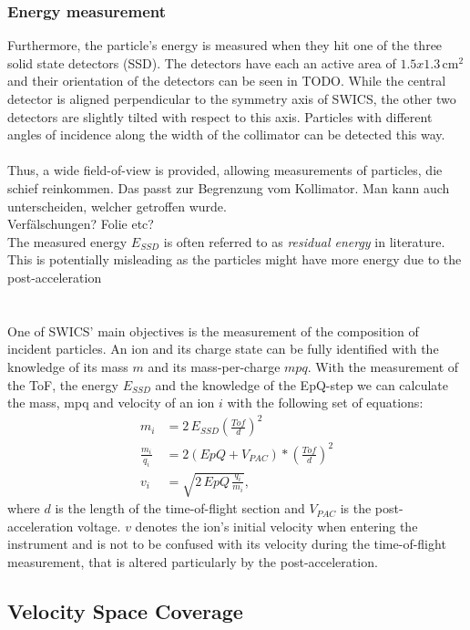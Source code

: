 \subsubsection{Energy measurement}
Furthermore, the particle's energy is measured when they hit one of the three solid state detectors (SSD). The detectors have each an active area of $1.5 x 1.3 \,\mathrm{cm^2}$ and their orientation of the detectors can be seen in TODO. While the central detector is aligned perpendicular to the symmetry axis of SWICS, the other two detectors are slightly tilted with respect to this axis. Particles with different angles of incidence along the width of the collimator can be detected this way.
\\ \\
Thus, a wide field-of-view is provided, allowing measurements of particles, die schief reinkommen. Das passt zur Begrenzung vom Kollimator. Man kann auch unterscheiden, welcher getroffen wurde.\\
Verfälschungen? Folie etc? \\ 
The measured energy $E_{SSD}$ is often referred to as \textit{residual energy} in literature. This is potentially misleading as the particles might have more energy due to the post-acceleration 
\\ \\ \\
One of SWICS' main objectives is the measurement of the composition of incident particles. An ion and its charge state can be fully identified with the knowledge of its mass $m$ and its mass-per-charge $mpq$. 
With the measurement of the ToF, the energy $E_{SSD}$ and the knowledge of the EpQ-step we can calculate the mass, mpq and velocity of an ion $i$ with the following set of equations:
\begin{align}
m_i &= 2\,E_{SSD} \left( \frac{Tof}{d}\right)^2 \label{eq:swics_set1}\\
\frac{m_i}{q_i} &= 2 \left(EpQ + V_{PAC}\right) * \left(\frac{Tof}{d}\right)^2 \label{eq:swics_set2} \\
v_i &= \sqrt{2\,EpQ\,\frac{q_i}{m_i}},
\label{eq:swics_set3}
\end{align}
where $d$ is the length of the time-of-flight section and $V_{PAC}$ is the post-acceleration voltage. $v$ denotes the ion's initial velocity when entering the instrument and is not to be confused with its velocity during the time-of-flight measurement, that is altered particularly by the post-acceleration.
\clearpage
\subsection{Velocity Space Coverage}
